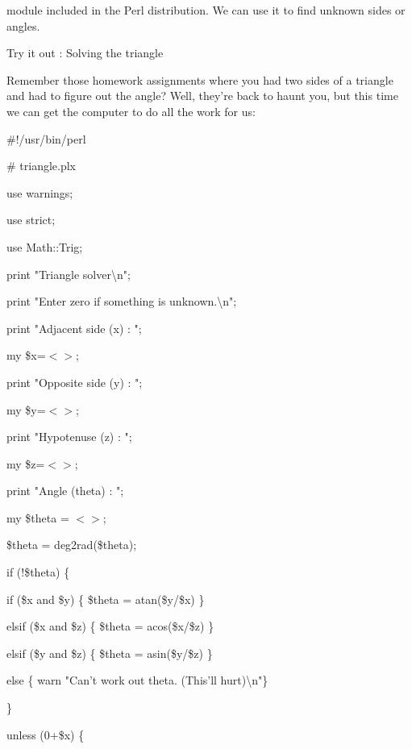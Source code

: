 \documentclass[a4paper,11pt]{book}
\begin{document}
\noindent module included in the Perl distribution. We can use it to find unknown sides or angles.

\noindent 

\noindent Try it out : Solving the triangle

\noindent Remember those homework assignments where you had two sides of a triangle and had to figure out the angle? Well, they're back to haunt you, but this time we can get the computer to do all the work for us:

\noindent 

\noindent \#!/usr/bin/perl

\noindent \# triangle.plx

\noindent use warnings;

\noindent use strict;

\noindent use Math::Trig;

\noindent 

\noindent print "Triangle solver\textbackslash n";

\noindent print "Enter zero if something is unknown.\textbackslash n";

\noindent print "Adjacent side (x) : ";

\noindent my \$x=$<$$>$;

\noindent print "Opposite side (y) : ";

\noindent my \$y=$<$$>$;

\noindent print "Hypotenuse (z) : ";

\noindent my \$z=$<$$>$;

\noindent print "Angle (theta) : ";

\noindent my \$theta = $<$$>$;

\noindent \$theta = deg2rad(\$theta);

\noindent 

\noindent if (!\$theta) \{

\noindent if (\$x and \$y) \{ \$theta = atan(\$y/\$x) \}

\noindent elsif (\$x and \$z) \{ \$theta = acos(\$x/\$z) \}

\noindent elsif (\$y and \$z) \{ \$theta = asin(\$y/\$z) \}

\noindent else  \{ warn "Can't work out theta. (This'll hurt)\textbackslash n"\}

\noindent \}

\noindent 

\noindent 

\noindent unless (0+\$x) \{
\end{document}
